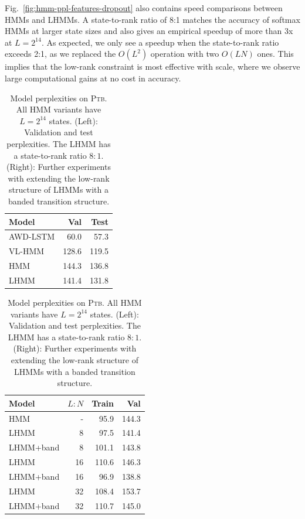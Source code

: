 \documentclass{article}
\begin{document}
Fig.~\ref{fig:hmm-ppl-features-dropout} also contains speed comparisons between HMMs and LHMMs.
A state-to-rank ratio of 8:1 matches the accuracy of softmax HMMs at larger state sizes and also gives an empirical speedup of more than 3x at $L = 2^{14}$.
As expected, we only see a speedup when the state-to-rank ratio exceeds 2:1,
as we replaced the $O(L^2)$ operation with two $O(LN)$ ones.
This implies that the low-rank constraint is most effective with scale,
where we observe large computational gains at no cost in accuracy.



\begin{table}[!t]
\centering
\begin{minipage}[t]{0.4\textwidth}
\centering
\begin{tabular}{lrr}
\toprule
Model & Val & Test\\

\midrule
AWD-LSTM & 60.0 & 57.3\\
VL-HMM & 128.6 & 119.5\\
HMM & 144.3 & 136.8\\
LHMM & 141.4 & 131.8\\
\bottomrule
\end{tabular}
\end{minipage}
\vspace{0em}
\hfill
\begin{minipage}[t]{0.55\textwidth}
\centering
\begin{tabular}{lrrr}
\toprule
Model & $L:N$ & Train & Val\\
\midrule
HMM & -  & 95.9 & 144.3\\
LHMM & 8 & 97.5 & 141.4\\
LHMM+band & 8 & 101.1 & 143.8\\
LHMM & 16 & 110.6 & 146.3 \\
LHMM+band & 16 & 96.9 & 138.8\\
LHMM & 32 & 108.4 & 153.7 \\
LHMM+band & 32 & 110.7 & 145.0\\
\bottomrule
\end{tabular}
\end{minipage}
\vspace{0.5em}
\caption{\label{tbl:hmm}
Model perplexities on \textsc{Ptb}.
All HMM variants have $L=2^{14}$ states.
(Left): Validation and test perplexities.
The LHMM has a state-to-rank ratio $8:1$.
(Right): Further experiments with extending the low-rank structure of LHMMs with a banded transition structure.
}
\end{table}
\end{document}
